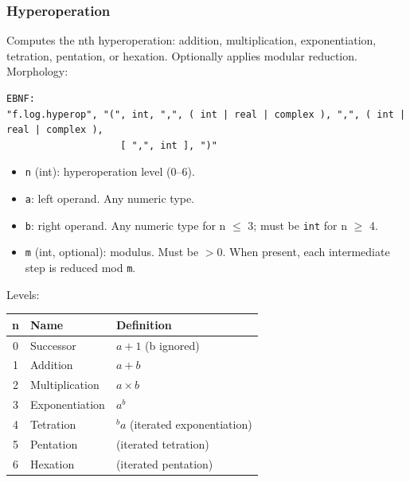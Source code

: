 \subsubsection{Hyperoperation}
Computes the nth hyperoperation: addition, multiplication, exponentiation, tetration, pentation, or hexation. Optionally applies modular reduction.\\
Morphology:
\begin{verbatim}
EBNF:
"f.log.hyperop", "(", int, ",", ( int | real | complex ), ",", ( int | real | complex ),
                    [ ",", int ], ")"
\end{verbatim}
\begin{itemize}
\item \texttt{n} (int): hyperoperation level (0--6).
\item \texttt{a}: left operand. Any numeric type.
\item \texttt{b}: right operand. Any numeric type for n $\leq$ 3; must be \texttt{int} for n $\geq$ 4.
\item \texttt{m} (int, optional): modulus. Must be $> 0$. When present, each intermediate step is reduced mod \texttt{m}.
\end{itemize}

\noindent Levels:
\begin{center}
\begin{tabular}{cll}
n & Name & Definition \\ \hline
0 & Successor & $a + 1$ (b ignored) \\
1 & Addition & $a + b$ \\
2 & Multiplication & $a \times b$ \\
3 & Exponentiation & $a^b$ \\
4 & Tetration & ${}^b a$ (iterated exponentiation) \\
5 & Pentation & (iterated tetration) \\
6 & Hexation & (iterated pentation) \\
\end{tabular}
\end{center}

